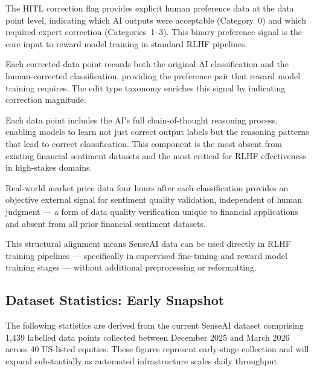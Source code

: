 \documentclass[11pt,a4paper]{article}
\begin{document}
\begin{description}[leftmargin=2em, style=nextline,
                    font=\bfseries\color{darkblue}]

  \item[Human preference signals.]
    The HITL correction flag provides explicit human preference data at the data point
    level, indicating which AI outputs were acceptable (Category~0) and which required
    expert correction (Categories~1--3). This binary preference signal is the core input
    to reward model training in standard RLHF pipelines.

  \item[Correction annotations.]
    Each corrected data point records both the original AI classification and the
    human-corrected classification, providing the preference pair that reward model
    training requires. The edit type taxonomy enriches this signal by indicating
    correction magnitude.

  \item[Reasoning context.]
    Each data point includes the AI's full chain-of-thought reasoning process, enabling
    models to learn not just correct output labels but the reasoning patterns that lead
    to correct classification. This component is the most absent from existing financial
    sentiment datasets and the most critical for RLHF effectiveness in high-stakes
    domains.

  \item[Outcome validation.]
    Real-world market price data four hours after each classification provides an
    objective external signal for sentiment quality validation, independent of human
    judgment --- a form of data quality verification unique to financial applications and
    absent from all prior financial sentiment datasets.

\end{description}

This structural alignment means SenseAI data can be used directly in RLHF training
pipelines --- specifically in supervised fine-tuning and reward model training stages ---
without additional preprocessing or reformatting.

\subsection{Dataset Statistics: Early Snapshot}

The following statistics are derived from the current SenseAI dataset comprising
1,439 labelled data points collected between December 2025 and March 2026 across
40 US-listed equities. These figures represent early-stage collection and will expand
substantially as automated infrastructure scales daily throughput.
\end{document}
